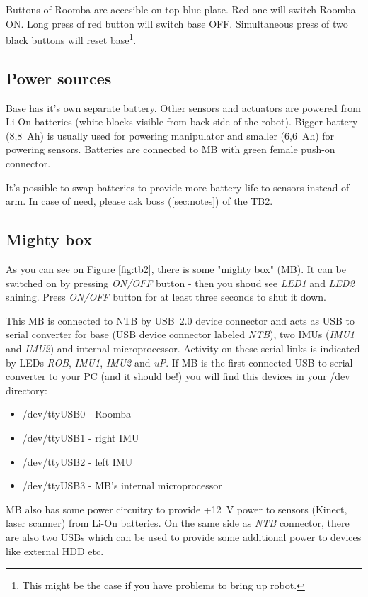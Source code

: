 \documentclass[12pt,a4paper,titlepage]{article}
\numberwithin{equation}{subsection}
\begin{document}
Buttons of Roomba are accesible on top blue plate. Red one will switch Roomba ON. Long press of red button will switch base OFF. Simultaneous press of two black buttons will reset base\footnote{This might be the case if you have problems to bring up robot.}.

\subsection{Power sources}

Base has it's own separate battery. Other sensors and actuators are powered from Li-On batteries (white blocks visible from back side of the robot). Bigger battery (8,8~Ah) is usually used for powering manipulator and smaller (6,6~Ah) for powering sensors. Batteries are connected to MB with green female push-on connector.

It's possible to swap batteries to provide more battery life to sensors instead of arm. In case of need, please ask boss (\ref{sec:notes}) of the TB2.

\subsection{Mighty box}

As you can see on Figure \ref{fig:tb2}, there is some "mighty box" (MB). It can be switched on by pressing \emph{ON/OFF} button - then you shoud see \emph{LED1} and \emph{LED2} shining. Press \emph{ON/OFF} button for at least three seconds to shut it down.

This MB is connected to NTB by USB~2.0 device connector and acts as USB to serial converter for base (USB device connector labeled \emph{NTB}), two IMUs (\emph{IMU1} and \emph{IMU2}) and internal microprocessor. Activity on these serial links is indicated by LEDs \emph{ROB}, \emph{IMU1}, \emph{IMU2} and \emph{uP}. If MB is the first connected USB to serial converter to your PC (and it should be!) you will find this devices in your /dev directory:

\begin{itemize}
  \item{/dev/ttyUSB0 - Roomba}
  \item{/dev/ttyUSB1 - right IMU}
  \item{/dev/ttyUSB2 - left IMU}
  \item{/dev/ttyUSB3 - MB's internal microprocessor}
\end{itemize}

MB also has some power circuitry to provide +12~V power to sensors (Kinect, laser scanner) from Li-On batteries. On the same side as \emph{NTB} connector, there are also two USBs which can be used to provide some additional power to devices like external HDD etc.
\end{document}
